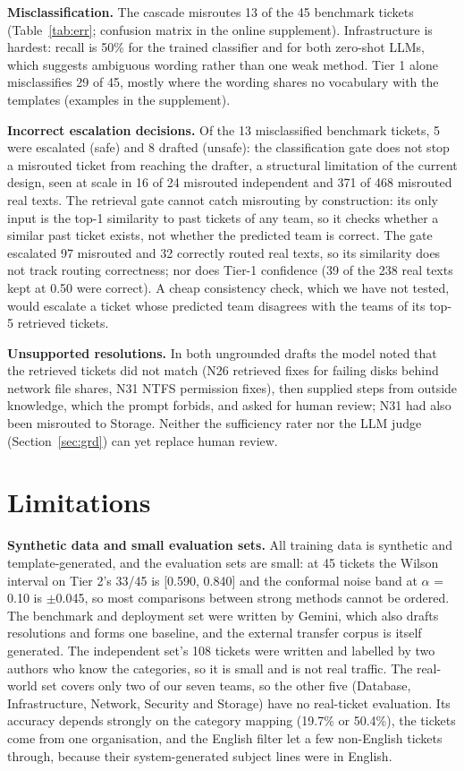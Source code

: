 \documentclass[conference,a4paper]{IEEEtran}
\begin{document}
\textbf{Misclassification.} The cascade misroutes 13 of the 45 benchmark tickets (Table~\ref{tab:err}; confusion matrix in the online supplement). Infrastructure is hardest: recall is 50\% for the trained classifier and for both zero-shot LLMs, which suggests ambiguous wording rather than one weak method. Tier 1 alone misclassifies 29 of 45, mostly where the wording shares no vocabulary with the templates (examples in the supplement).

\textbf{Incorrect escalation decisions.} Of the 13 misclassified benchmark tickets, 5 were escalated (safe) and 8 drafted (unsafe): the classification gate does not stop a misrouted ticket from reaching the drafter, a structural limitation of the current design, seen at scale in 16 of 24 misrouted independent and 371 of 468 misrouted real texts. The retrieval gate cannot catch misrouting by construction: its only input is the top-1 similarity to past tickets of any team, so it checks whether a similar past ticket exists, not whether the predicted team is correct. The gate escalated 97 misrouted and 32 correctly routed real texts, so its similarity does not track routing correctness; nor does Tier-1 confidence (39 of the 238 real texts kept at 0.50 were correct). A cheap consistency check, which we have not tested, would escalate a ticket whose predicted team disagrees with the teams of its top-5 retrieved tickets.

\textbf{Unsupported resolutions.} In both ungrounded drafts the model noted that the retrieved tickets did not match (N26 retrieved fixes for failing disks behind network file shares, N31 NTFS permission fixes), then supplied steps from outside knowledge, which the prompt forbids, and asked for human review; N31 had also been misrouted to Storage. Neither the sufficiency rater nor the LLM judge (Section~\ref{sec:grd}) can yet replace human review.

\section{Limitations}\label{sec:lim}

\textbf{Synthetic data and small evaluation sets.} All training data is synthetic and template-generated, and the evaluation sets are small: at 45 tickets the Wilson interval on Tier 2's 33/45 is [0.590, 0.840] and the conformal noise band at $\alpha$ = 0.10 is $\pm$0.045, so most comparisons between strong methods cannot be ordered. The benchmark and deployment set were written by Gemini, which also drafts resolutions and forms one baseline, and the external transfer corpus is itself generated. The independent set's 108 tickets were written and labelled by two authors who know the categories, so it is small and is not real traffic. The real-world set covers only two of our seven teams, so the other five (Database, Infrastructure, Network, Security and Storage) have no real-ticket evaluation. Its accuracy depends strongly on the category mapping (19.7\% or 50.4\%), the tickets come from one organisation, and the English filter let a few non-English tickets through, because their system-generated subject lines were in English.
\end{document}

